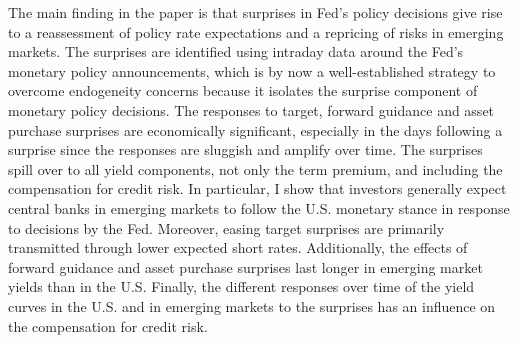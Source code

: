 {The main finding in the paper is that surprises in Fed's policy decisions give rise to a reassessment of policy rate expectations and a repricing of risks in emerging markets.
The surprises are identified using intraday data around the Fed's monetary policy announcements, which is by now a well-established strategy to overcome endogeneity concerns because it isolates the surprise component of monetary policy decisions.
The responses to target, forward guidance and asset purchase surprises are economically significant, especially in the days following a surprise since the responses are sluggish and amplify over time.
The surprises spill over to all yield components, not only the term premium, and including the compensation for credit risk.
In particular, I show that investors generally expect central banks in emerging markets to follow the U.S. monetary stance in response to decisions by the Fed. 
Moreover, easing target surprises are primarily transmitted through lower expected short rates.
Additionally, the effects of forward guidance and asset purchase surprises last longer in emerging market yields than in the U.S.
Finally, the different responses over time of the yield curves in the U.S. and in emerging markets to the surprises has an influence on the compensation for credit risk.

}
